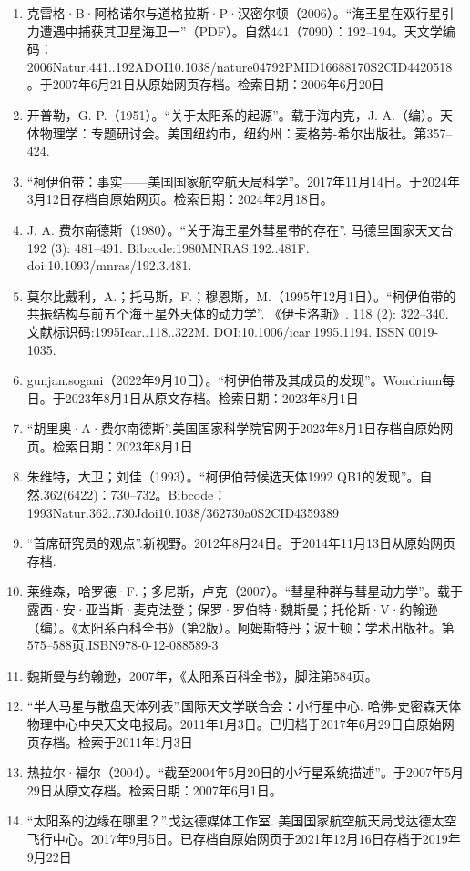 \begin{enumerate}
\item 克雷格·B·阿格诺尔与道格拉斯·P·汉密尔顿（2006）。“海王星在双行星引力遭遇中捕获其卫星海卫一”（PDF）。自然441（7090）：192–194。天文学编码：2006Natur.441..192ADOI10.1038/nature04792PMID16688170S2CID4420518。于2007年6月21日从原始网页存档。检索日期：2006年6月20日
\item 开普勒，G. P.（1951）。“关于太阳系的起源”。载于海内克，J. A.（编）。天体物理学：专题研讨会。美国纽约市，纽约州：麦格劳-希尔出版社。第357–424.
\item “柯伊伯带：事实——美国国家航空航天局科学”。2017年11月14日。于2024年3月12日存档自原始网页。检索日期：2024年2月18日。
\item J. A. 费尔南德斯（1980）。“关于海王星外彗星带的存在”. 马德里国家天文台. 192 (3): 481–491. Bibcode:1980MNRAS.192..481F. doi:10.1093/mnras/192.3.481.
\item 莫尔比戴利，A.；托马斯，F.；穆恩斯，M.（1995年12月1日）。“柯伊伯带的共振结构与前五个海王星外天体的动力学”. 《伊卡洛斯》. 118 (2): 322–340. 文献标识码:1995Icar..118..322M. DOI:10.1006/icar.1995.1194. ISSN 0019-1035.
\item gunjan.sogani（2022年9月10日）。“柯伊伯带及其成员的发现”。Wondrium每日。于2023年8月1日从原文存档。检索日期：2023年8月1日
\item “胡里奥·A·费尔南德斯”.美国国家科学院官网于2023年8月1日存档自原始网页。检索日期：2023年8月1日
\item 朱维特，大卫；刘佳（1993）。“柯伊伯带候选天体1992 QB1的发现”。自然.362(6422)：730–732。Bibcode：1993Natur.362..730Jdoi10.1038/362730a0S2CID4359389
\item “首席研究员的观点”.新视野。2012年8月24日。于2014年11月13日从原始网页存档.
\item 莱维森，哈罗德·F.；多尼斯，卢克（2007）。“彗星种群与彗星动力学”。载于露西·安·亚当斯·麦克法登；保罗·罗伯特·魏斯曼；托伦斯·V·约翰逊（编）。《太阳系百科全书》（第2版）。阿姆斯特丹；波士顿：学术出版社。第575–588页.ISBN978-0-12-088589-3
\item 魏斯曼与约翰逊，2007年，《太阳系百科全书》，脚注第584页。
\item “半人马星与散盘天体列表”.国际天文学联合会：小行星中心. 哈佛-史密森天体物理中心中央天文电报局。2011年1月3日。已归档于2017年6月29日自原始网页存档。检索于2011年1月3日
\item 热拉尔·福尔（2004）。“截至2004年5月20日的小行星系统描述”。于2007年5月29日从原文存档。检索日期：2007年6月1日。
\item “太阳系的边缘在哪里？”.戈达德媒体工作室. 美国国家航空航天局戈达德太空飞行中心。2017年9月5日。已存档自原始网页于2021年12月16日存档于2019年9月22日

\end{enumerate}
